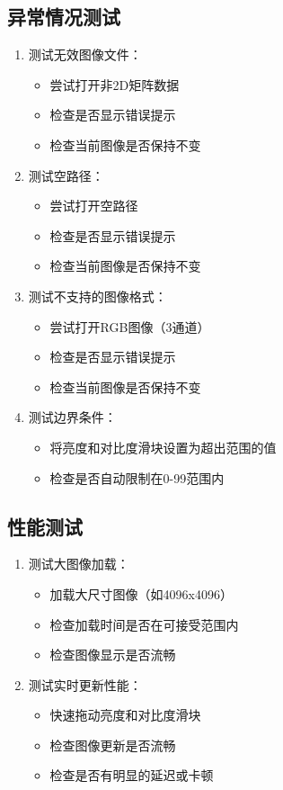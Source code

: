 \documentclass[a4paper,12pt]{report}	%
\begin{document}
\subsection{异常情况测试}
\begin{enumerate}
    \item 测试无效图像文件：
    \begin{itemize}
        \item 尝试打开非2D矩阵数据
        \item 检查是否显示错误提示
        \item 检查当前图像是否保持不变
    \end{itemize}

    \item 测试空路径：
    \begin{itemize}
        \item 尝试打开空路径
        \item 检查是否显示错误提示
        \item 检查当前图像是否保持不变
    \end{itemize}

    \item 测试不支持的图像格式：
    \begin{itemize}
        \item 尝试打开RGB图像（3通道）
        \item 检查是否显示错误提示
        \item 检查当前图像是否保持不变
    \end{itemize}

    \item 测试边界条件：
    \begin{itemize}
        \item 将亮度和对比度滑块设置为超出范围的值
        \item 检查是否自动限制在0-99范围内
    \end{itemize}
\end{enumerate}

\subsection{性能测试}
\begin{enumerate}
    \item 测试大图像加载：
    \begin{itemize}
        \item 加载大尺寸图像（如4096x4096）
        \item 检查加载时间是否在可接受范围内
        \item 检查图像显示是否流畅
    \end{itemize}

    \item 测试实时更新性能：
    \begin{itemize}
        \item 快速拖动亮度和对比度滑块
        \item 检查图像更新是否流畅
        \item 检查是否有明显的延迟或卡顿
    \end{itemize}
\end{enumerate}
\end{document}
